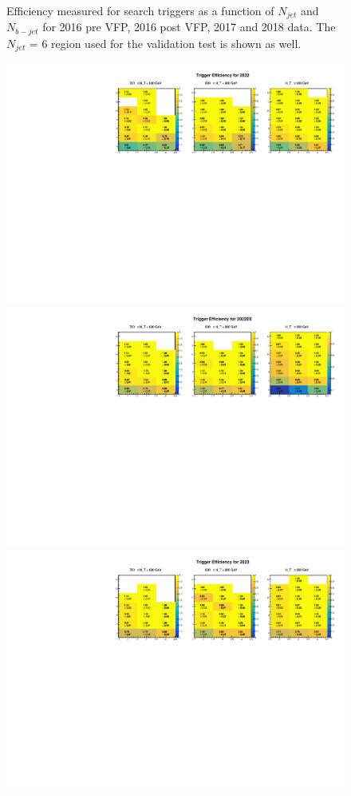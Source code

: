 \documentclass[twoside]{article}
\begin{document}
\begin{figure}[!t]
    \caption{Efficiency measured for search triggers as a function of $N_{jet}$ and $N_{b-jet}$ for 2016 pre VFP, 2016 post VFP, 2017 and 2018 data. The $N_{jet}$ = 6 region used for the validation test is shown as well.}
\end{figure}

\begin{figure}[!t]
    \centering
     \includegraphics[width=.8\columnwidth]{plots/Trigger/2022.pdf}
    \includegraphics[width=.8\columnwidth]{plots/Trigger/2022EE.pdf}
    \includegraphics[width=.8\columnwidth]{plots/Trigger/2023.pdf}

\end{figure}
\end{document}
